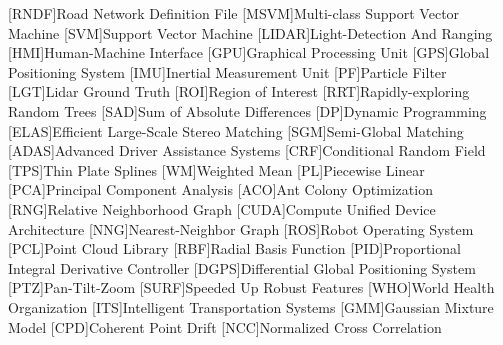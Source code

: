 [RNDF]{Road Network Definition File}
[MSVM]{Multi-class Support Vector Machine}
[SVM]{Support Vector Machine}
[LIDAR]{Light-Detection And Ranging}
[HMI]{Human-Machine Interface}
[GPU]{Graphical Processing Unit}
[GPS]{Global Positioning System}
[IMU]{Inertial Measurement Unit}
[PF]{Particle Filter}
[LGT]{Lidar Ground Truth}
[ROI]{Region of Interest}
[RRT]{Rapidly-exploring Random Trees}
[SAD]{Sum of Absolute Differences}
[DP]{Dynamic Programming}
[ELAS]{Efficient Large-Scale Stereo Matching}
[SGM]{Semi-Global Matching}
[ADAS]{Advanced Driver Assistance Systems}
[CRF]{Conditional Random Field}
[TPS]{Thin Plate Splines}
[WM]{Weighted Mean}
[PL]{Piecewise Linear}
[PCA]{Principal Component Analysis}
[ACO]{Ant Colony Optimization}
[RNG]{Relative Neighborhood Graph}
[CUDA]{Compute Unified Device Architecture}
[NNG]{Nearest-Neighbor Graph}
[ROS]{Robot Operating System}
[PCL]{Point Cloud Library}
[RBF]{Radial Basis Function}
[PID]{Proportional Integral Derivative Controller}
[DGPS]{Differential Global Positioning System}
[PTZ]{Pan-Tilt-Zoom}
[SURF]{Speeded Up Robust Features}
[WHO]{World Health Organization}
[ITS]{Intelligent Transportation Systems}
[GMM]{Gaussian Mixture Model}
[CPD]{Coherent Point Drift}
[NCC]{Normalized Cross Correlation}


